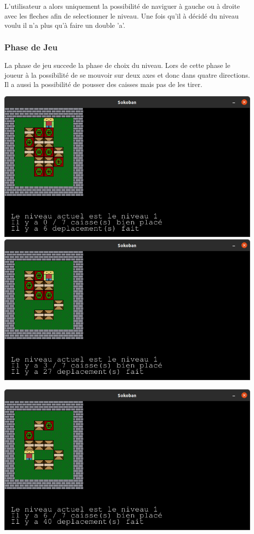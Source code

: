 \documentclass[a4paper,12pt]{article} %
\begin{document}
L'utilisateur a alors uniquement la possibilité de naviguer à gauche ou à droite avec les fleches afin de selectionner le niveau.
Une fois qu'il à décidé du niveau voulu il n'a plus qu'à faire un double 'a'.

\subsubsection{Phase de Jeu}

La phase de jeu succede la phase de choix du niveau.
Lors de cette phase le joueur à la possibilité de se mouvoir sur deux axes et donc dans quatre directions.
Il a aussi la possibilité de pousser des caisses mais pas de les tirer.

\includegraphics[scale = 0.25]{../picture/game1.png}
\includegraphics[scale = 0.25]{../picture/game2.png}

\includegraphics[scale = 0.25]{../picture/game3.png}
\end{document}
